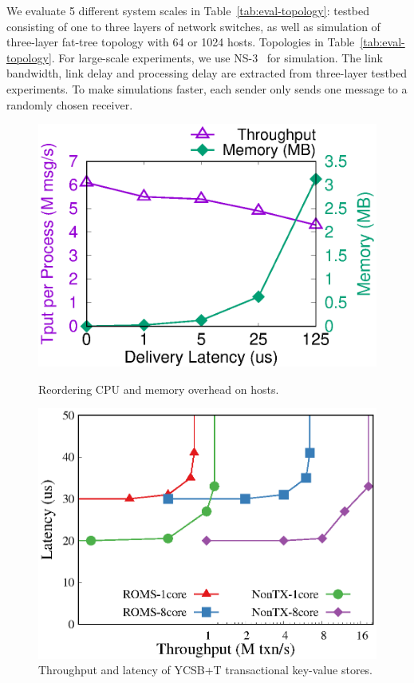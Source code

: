 We evaluate 5 different system scales in Table~\ref{tab:eval-topology}: testbed consisting of one to three layers of network switches, as well as simulation of three-layer fat-tree topology with 64 or 1024 hosts.
Topologies in Table~\ref{tab:eval-topology}.
For large-scale experiments, we use NS-3~\cite{henderson2008network} for simulation.
The link bandwidth, link delay and processing delay are extracted from three-layer testbed experiments.
To make simulations faster, each sender only sends one message to a randomly chosen receiver.
\fi

\iffalse
\begin{figure}[t!]
	\begin{minipage}{.31\textwidth}
    	\centering
		\includegraphics[width=\textwidth]{gnuplot/reorder_receiver.eps}
		\caption{Reordering CPU and memory overhead on hosts.}

	\end{minipage}
    \hspace{0.01\textwidth}
    \begin{minipage}{.31\textwidth}
    	\centering
		\includegraphics[width=\textwidth]{gnuplot/ycsb.eps}
		\caption{Throughput and latency of YCSB+T transactional key-value stores.}
		\label{fig:ycsb}


\end{minipage}
\end{figure}
